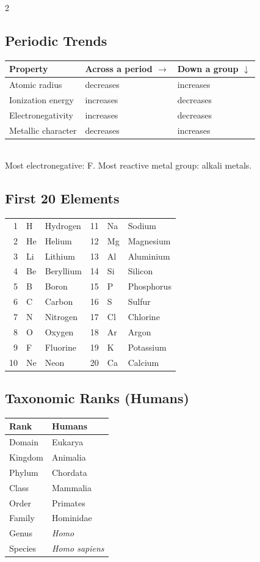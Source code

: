 \begin{multicols}{2}
\subsection*{Periodic Trends}
\begin{tabular}{@{}p{2.8cm}p{2.4cm}p{2.4cm}@{}}
\toprule
Property & Across a period $\rightarrow$ & Down a group $\downarrow$\\ \midrule
Atomic radius & decreases & increases\\
Ionization energy & increases & decreases\\
Electronegativity & increases & decreases\\
Metallic character & decreases & increases\\ \bottomrule
\end{tabular}\\[2pt]
Most electronegative: F. Most reactive metal group: alkali metals.

\subsection*{First 20 Elements}
\begin{tabular}{@{}r@{\ }l@{\ }p{1.7cm}r@{\ }l@{\ }p{1.7cm}@{}}
\toprule
1 & H & Hydrogen & 11 & Na & Sodium\\
2 & He & Helium & 12 & Mg & Magnesium\\
3 & Li & Lithium & 13 & Al & Aluminium\\
4 & Be & Beryllium & 14 & Si & Silicon\\
5 & B & Boron & 15 & P & Phosphorus\\
6 & C & Carbon & 16 & S & Sulfur\\
7 & N & Nitrogen & 17 & Cl & Chlorine\\
8 & O & Oxygen & 18 & Ar & Argon\\
9 & F & Fluorine & 19 & K & Potassium\\
10 & Ne & Neon & 20 & Ca & Calcium\\ \bottomrule
\end{tabular}

\subsection*{Taxonomic Ranks (Humans)}
\begin{tabular}{@{}p{2.2cm}p{3.6cm}@{}}
\toprule
Rank & Humans\\ \midrule
Domain & Eukarya\\
Kingdom & Animalia\\
Phylum & Chordata\\
Class & Mammalia\\
Order & Primates\\
Family & Hominidae\\
Genus & \emph{Homo}\\
Species & \emph{Homo sapiens}\\ \bottomrule
\end{tabular}


\end{multicols}
